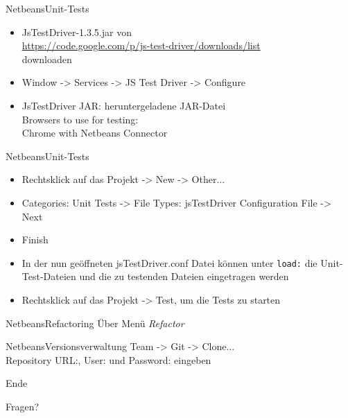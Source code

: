 \documentclass[xcolor=dvipsnames,pdftex]{beamer}
\begin{document}
\begin{frame}{Netbeans}{Unit-Tests}
	\begin{itemize}
		\item JsTestDriver-1.3.5.jar von\\
			\href{https://code.google.com/p/js-test-driver/downloads/list}{https://code.google.com/p/js-test-driver/downloads/list}\\
			downloaden\\
		\item Window -> Services -> JS Test Driver -> Configure\\
		\item JsTestDriver JAR: heruntergeladene JAR-Datei\\
			Browsers to use for testing:\\
			Chrome with Netbeans Connector
	\end{itemize}
\end{frame}


\begin{frame}{Netbeans}{Unit-Tests}
	\begin{itemize}
		\item Rechtsklick auf das Projekt -> New -> Other...\\
		\item Categories: Unit Tests -> File Types: jsTestDriver Configuration File -> Next\\
		\item Finish\\
		\item In der nun geöffneten jsTestDriver.conf Datei können unter \texttt{load:}
			die Unit-Test-Dateien und die zu testenden Dateien eingetragen werden\\
		\item Rechtsklick auf das Projekt -> Test, um die Tests zu starten
	\end{itemize}
\end{frame}

\begin{frame}{Netbeans}{Refactoring}
	Über Menü \textit{Refactor}
\end{frame}

\begin{frame}{Netbeans}{Versionsverwaltung}
	Team -> Git -> Clone...\\
	Repository URL:, User: und Password: eingeben
\end{frame}

\begin{frame}{Ende}
	\begin{center}
		\Large{Fragen?}
	\end{center}
\end{frame}
\end{document}
